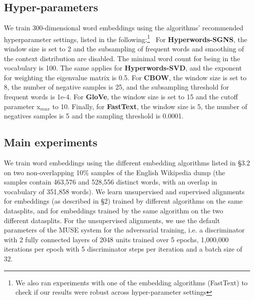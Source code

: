 \documentclass[11pt,a4paper]{article}
\begin{document}
\subsection{Hyper-parameters}
We train 300-dimensional word embeddings using the algorithms' recommended hyperparameter settings, listed in the following:\footnote{We also ran experiments with one of the embedding algorithms (FastText) to check if our results were robust across hyper-parameter settings}~ For \textbf{Hyperwords-SGNS}, the window size is set to 2 and the subsampling of frequent words and smoothing of the context distribution are disabled. The minimal word count for being in the vocabulary is 100. The same applies for \textbf{Hyperwords-SVD}, and the exponent for weighting the eigenvalue matrix is 0.5. For \textbf{CBOW}, the window size is set to 8, the number of negative samples is 25, and the subsampling threshold for frequent words  is 1e-4. For \textbf{GloVe}, the window size is set to 15 and the cutoff parameter x$_{max}$ to 10.  
Finally, for \textbf{FastText}, the window size is 5, the number of negatives samples is 5 and the sampling threshold is 0.0001.

\subsection{Main experiments}

We train word embeddings using the different embedding algorithms listed in \S3.2 on two non-overlapping 10\% samples of the English Wikipedia dump (the samples contain 463,576 and 528,556 distinct words, with an overlap in vocabulary of 351,858 words). We learn unsupervised and supervised alignments for embeddings (as described in \S2) trained by different algorithms on the same datasplits, and for embeddings trained by the same algorithm on the two different datasplits. For the unsupervised alignments, we use the default parameters of the MUSE system for the adversarial training, i.e. a discriminator with 2 fully connected layers of 2048 units trained over 5 epochs, 1,000,000 iterations per epoch with 5 discriminator steps per iteration and a batch size of 32. 
\end{document}
